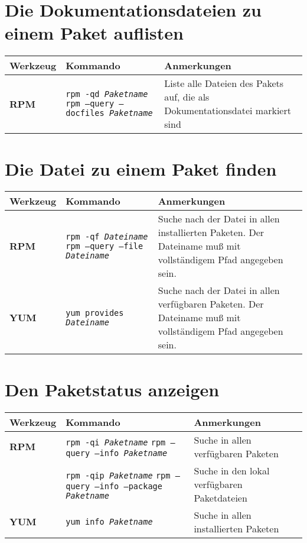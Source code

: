 \documentclass[10pt,a4paper]{article}
\begin{document}
\section{Die Dokumentationsdateien zu einem Paket auflisten}
\begin{tabular}{ p{3.5cm} p{9cm} p{11cm}}
  \hline
  \rowcolor{Gray}
  \textbf{Werkzeug} & \textbf{Kommando} & \textbf{Anmerkungen} \\
  \hline 
  \textbf{RPM} & \texttt{rpm -qd \textit{Paketname}} \newline \texttt{rpm --query --docfiles \textit{Paketname}} & Liste alle Dateien des Pakets auf, die als Dokumentationsdatei markiert sind\\
  \hline
\end{tabular}
\newpage

\cheatsheet

\section{Die Datei zu einem Paket finden}
\begin{tabular}{ p{3.5cm} p{9cm} p{11cm}}
  \hline
  \rowcolor{Gray}
  \textbf{Werkzeug} & \textbf{Kommando} & \textbf{Anmerkungen} \\
  \hline 
  \textbf{RPM} & \texttt{rpm -qf \textit{Dateiname}} \newline \texttt{rpm --query --file \textit{Dateiname}} & Suche nach der Datei in allen installierten Paketen. Der Dateiname muß mit vollständigem Pfad angegeben sein.\\
  \rowcolor{Gray}
  \textbf{YUM} & \texttt{yum provides \textit{Dateiname}} & Suche nach der Datei in allen verfügbaren Paketen. Der Dateiname muß mit vollständigem Pfad angegeben sein. \\
  \hline
\end{tabular}

\section{Den Paketstatus anzeigen}
\begin{tabular}{ p{3.5cm} p{9cm} p{11cm}}
  \hline
  \rowcolor{Gray}
  \textbf{Werkzeug} & \textbf{Kommando} & \textbf{Anmerkungen} \\
  \hline 
  \textbf{RPM} & \texttt{rpm -qi \textit{Paketname}} \newline \texttt{rpm --query --info \textit{Paketname}} & Suche in allen verfügbaren Paketen\\
  \rowcolor{Gray}
  & \texttt{rpm -qip \textit{Paketname}} \newline \texttt{rpm --query --info --package \textit{Paketname}} & Suche in den lokal verfügbaren Paketdateien\\
  \textbf{YUM} & \texttt{yum info \textit{Paketname}} & Suche in allen installierten Paketen\\
  \hline
\end{tabular}
\end{document}
